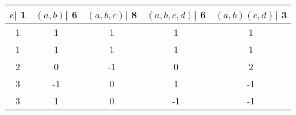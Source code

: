 \begin{tabular}{ccccc}
\toprule
 $e$| 1 &  $(a, b)$| 6 &  $(a, b, c)$| 8 &  $(a, b, c, d)$| 6 &  $(a, b)(c,d)$| 3 \\
\midrule
      1 &            1 &               1 &                  1 &                 1 \\
      1 &            1 &               1 &                  1 &                 1 \\
      2 &            0 &              -1 &                  0 &                 2 \\
      3 &           -1 &               0 &                  1 &                -1 \\
      3 &            1 &               0 &                 -1 &                -1 \\
\bottomrule
\end{tabular}
